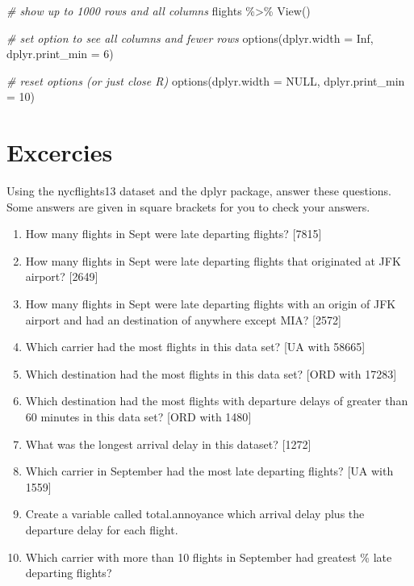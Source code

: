 \documentclass[
]{book}
\newenvironment{Shaded}{\begin{snugshade}}{\end{snugshade}}
\newcommand{\AttributeTok}[1]{\textcolor[rgb]{0.77,0.63,0.00}{#1}}
\newcommand{\CommentTok}[1]{\textcolor[rgb]{0.56,0.35,0.01}{\textit{#1}}}
\newcommand{\ConstantTok}[1]{\textcolor[rgb]{0.00,0.00,0.00}{#1}}
\newcommand{\DecValTok}[1]{\textcolor[rgb]{0.00,0.00,0.81}{#1}}
\newcommand{\FunctionTok}[1]{\textcolor[rgb]{0.00,0.00,0.00}{#1}}
\newcommand{\NormalTok}[1]{#1}
\newcommand{\SpecialCharTok}[1]{\textcolor[rgb]{0.00,0.00,0.00}{#1}}
\providecommand{\tightlist}{%
  \setlength{\itemsep}{0pt}\setlength{\parskip}{0pt}}
\begin{document}
\begin{Shaded}
\begin{Highlighting}[]
\CommentTok{\# show up to 1000 rows and all columns}
\NormalTok{flights }\SpecialCharTok{\%\textgreater{}\%} \FunctionTok{View}\NormalTok{()}

\CommentTok{\# set option to see all columns and fewer rows}
\FunctionTok{options}\NormalTok{(}\AttributeTok{dplyr.width =} \ConstantTok{Inf}\NormalTok{, }\AttributeTok{dplyr.print\_min =} \DecValTok{6}\NormalTok{)}

\CommentTok{\# reset options (or just close R)}
\FunctionTok{options}\NormalTok{(}\AttributeTok{dplyr.width =} \ConstantTok{NULL}\NormalTok{, }\AttributeTok{dplyr.print\_min =} \DecValTok{10}\NormalTok{)}
\end{Highlighting}
\end{Shaded}

\hypertarget{excercies}{%
\section{Excercies}\label{excercies}}

Using the nycflights13 dataset and the dplyr package, answer these questions. Some answers are given in square brackets for you to check your answers.

\begin{enumerate}
\def\labelenumi{\arabic{enumi}.}
\tightlist
\item
  How many flights in Sept were late departing flights? {[}7815{]}
\item
  How many flights in Sept were late departing flights that originated at JFK airport? {[}2649{]}
\item
  How many flights in Sept were late departing flights with an origin of JFK airport and had an destination of anywhere except MIA? {[}2572{]}
\item
  Which carrier had the most flights in this data set? {[}UA with 58665{]}
\item
  Which destination had the most flights in this data set? {[}ORD with 17283{]}
\item
  Which destination had the most flights with departure delays of greater than 60 minutes in this data set? {[}ORD with 1480{]}
\item
  What was the longest arrival delay in this dataset? {[}1272{]}
\item
  Which carrier in September had the most late departing flights? {[}UA with 1559{]}
\item
  Create a variable called total.annoyance which arrival delay plus the departure delay for each flight.
\item
  Which carrier with more than 10 flights in September had greatest \% late departing flights?
\end{enumerate}
\end{document}
